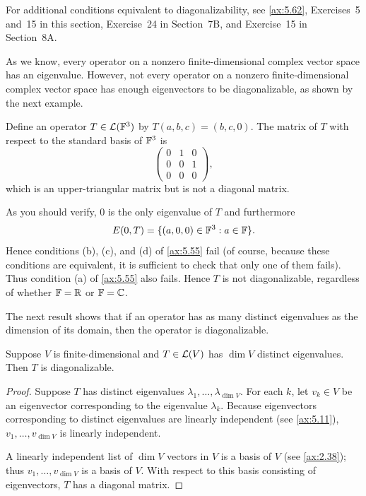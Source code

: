 For additional conditions equivalent to diagonalizability, see \ref{ax:5.62},
Exercises~5 and~15 in this section, Exercise~24 in Section~7B, and Exercise~15
in Section~8A.

As we know, every operator on a nonzero finite-dimensional complex vector space
has an eigenvalue. However, not every operator on a nonzero finite-dimensional
complex vector space has enough eigenvectors to be diagonalizable, as shown by
the next example.

\begin{example}\label{ax:5.57}
Define an operator $T\in\mathcal{L}(\mathbb{F}^3)$ by $T(a,b,c)=(b,c,0)$. The matrix of $T$
with respect to the standard basis of $\mathbb{F}^3$ is
\[ \begin{pmatrix} 0&1&0\\ 0&0&1\\ 0&0&0 \end{pmatrix}, \]
which is an upper-triangular matrix but is not a diagonal matrix.

As you should verify, $0$ is the only eigenvalue of $T$ and furthermore
\[ E(0,T)=\{(a,0,0)\in\mathbb{F}^3 : a\in\mathbb{F}\}. \]
Hence conditions (b), (c), and (d) of \ref{ax:5.55} fail (of course, because
these conditions are equivalent, it is sufficient to check that only one of them
fails). Thus condition (a) of \ref{ax:5.55} also fails. Hence $T$ is not
diagonalizable, regardless of whether $\mathbb{F}=\mathbb{R}$ or $\mathbb{F}=\mathbb{C}$.
\end{example}

The next result shows that if an operator has as many distinct eigenvalues as the
dimension of its domain, then the operator is diagonalizable.

\begin{result}\label{ax:5.58}
Suppose $V$ is finite-dimensional and $T\in\mathcal{L}(V)$ has $\dim V$ distinct
eigenvalues. Then $T$ is diagonalizable.
\end{result}

\begin{proof}
Suppose $T$ has distinct eigenvalues $\lambda_1,\dots,\lambda_{\dim V}$. For
each $k$, let $v_k\in V$ be an eigenvector corresponding to the eigenvalue
$\lambda_k$. Because eigenvectors corresponding to distinct eigenvalues are
linearly independent (see \ref{ax:5.11}), $v_1,\dots,v_{\dim V}$ is linearly
independent.

A linearly independent list of $\dim V$ vectors in $V$ is a basis of $V$ (see
\ref{ax:2.38}); thus $v_1,\dots,v_{\dim V}$ is a basis of $V$. With respect to
this basis consisting of eigenvectors, $T$ has a diagonal matrix.
\end{proof}

